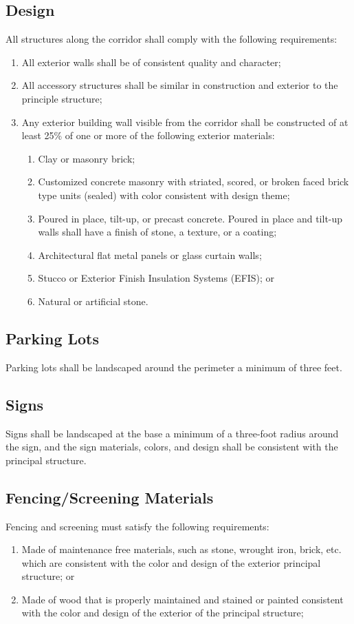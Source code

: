 \subsection{Design}
All structures along the corridor shall comply with the following requirements:
\begin{enumerate}[{\indent}1)]
    \item All exterior walls shall be of consistent quality and character;
    \item All accessory structures shall be similar in construction and exterior to the principle structure;
    \item Any exterior building wall visible from the corridor shall be constructed of at least 25\% of one or more of the following exterior materials:
\begin{enumerate}
    \item Clay or masonry brick;
    \item Customized concrete masonry with striated, scored, or broken faced brick type units (sealed) with color consistent with design theme;
    \item Poured in place, tilt-up, or precast concrete. Poured in place and tilt-up walls shall have a finish of stone, a texture, or a coating;
    \item Architectural flat metal panels or glass curtain walls;
    \item Stucco or Exterior Finish Insulation Systems (EFIS); or
    \item Natural or artificial stone.
\end{enumerate}
\end{enumerate}
\subsection{Parking Lots}
Parking lots shall be landscaped around the perimeter a minimum of three feet.
\subsection{Signs}
Signs shall be landscaped at  the  base a minimum  of  a  three-foot  radius around the sign, and the sign materials, colors, and design shall be consistent with the principal structure.
\subsection{Fencing/Screening Materials}
Fencing and screening must satisfy the following requirements:
\begin{enumerate}[{\indent}1)]
    \item Made of maintenance free materials, such as stone, wrought iron, brick, etc. which are consistent with the color and design of the exterior principal structure; or
    \item Made of wood that is properly maintained and stained or painted consistent with the color and design of the exterior of the principal structure;
\end{enumerate}

